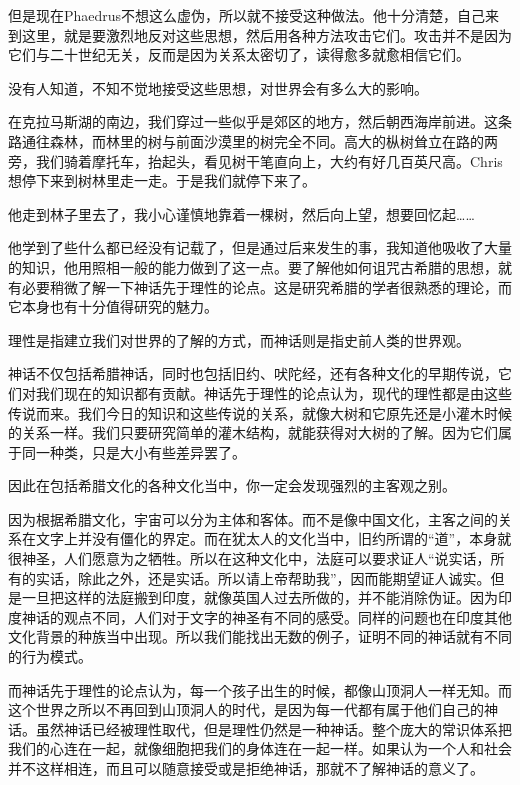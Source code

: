 \documentclass[UTF8]{article}
\begin{document}
\par 但是现在Phaedrus不想这么虚伪，所以就不接受这种做法。他十分清楚，自己来到这里，就是要激烈地反对这些思想，然后用各种方法攻击它们。攻击并不是因为它们与二十世纪无关，反而是因为关系太密切了，读得愈多就愈相信它们。
\par 没有人知道，不知不觉地接受这些思想，对世界会有多么大的影响。
\par 在克拉马斯湖的南边，我们穿过一些似乎是郊区的地方，然后朝西海岸前进。这条路通往森林，而林里的树与前面沙漠里的树完全不同。高大的枞树耸立在路的两旁，我们骑着摩托车，抬起头，看见树干笔直向上，大约有好几百英尺高。Chris想停下来到树林里走一走。于是我们就停下来了。
\par 他走到林子里去了，我小心谨慎地靠着一棵树，然后向上望，想要回忆起……
\par 他学到了些什么都已经没有记载了，但是通过后来发生的事，我知道他吸收了大量的知识，他用照相一般的能力做到了这一点。要了解他如何诅咒古希腊的思想，就有必要稍微了解一下神话先于理性的论点。这是研究希腊的学者很熟悉的理论，而它本身也有十分值得研究的魅力。
\par 理性是指建立我们对世界的了解的方式，而神话则是指史前人类的世界观。
\par 神话不仅包括希腊神话，同时也包括旧约、吠陀经，还有各种文化的早期传说，它们对我们现在的知识都有贡献。神话先于理性的论点认为，现代的理性都是由这些传说而来。我们今日的知识和这些传说的关系，就像大树和它原先还是小灌木时候的关系一样。我们只要研究简单的灌木结构，就能获得对大树的了解。因为它们属于同一种类，只是大小有些差异罢了。
\par 因此在包括希腊文化的各种文化当中，你一定会发现强烈的主客观之别。
\par 因为根据希腊文化，宇宙可以分为主体和客体。而不是像中国文化，主客之间的关系在文字上并没有僵化的界定。而在犹太人的文化当中，旧约所谓的“道”，本身就很神圣，人们愿意为之牺牲。所以在这种文化中，法庭可以要求证人“说实话，所有的实话，除此之外，还是实话。所以请上帝帮助我”，因而能期望证人诚实。但是一旦把这样的法庭搬到印度，就像英国人过去所做的，并不能消除伪证。因为印度神话的观点不同，人们对于文字的神圣有不同的感受。同样的问题也在印度其他文化背景的种族当中出现。所以我们能找出无数的例子，证明不同的神话就有不同的行为模式。
\par 而神话先于理性的论点认为，每一个孩子出生的时候，都像山顶洞人一样无知。而这个世界之所以不再回到山顶洞人的时代，是因为每一代都有属于他们自己的神话。虽然神话已经被理性取代，但是理性仍然是一种神话。整个庞大的常识体系把我们的心连在一起，就像细胞把我们的身体连在一起一样。如果认为一个人和社会并不这样相连，而且可以随意接受或是拒绝神话，那就不了解神话的意义了。
\end{document}
